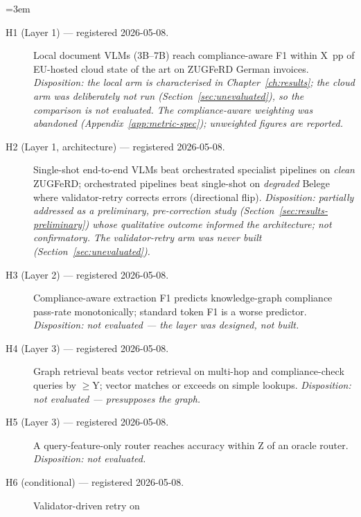 \begingroup\emergencystretch=3em
\begin{description}
  \item[H1 (Layer 1) --- registered 2026-05-08.] Local document \acp{VLM}
        (3B--7B) reach compliance-aware \ac{F1} within X~pp of \ac{EU}-hosted cloud
        state of the art on \ac{ZUGFeRD} German invoices.
        \emph{Disposition: the local arm is characterised in
        Chapter~\ref{ch:results}; the cloud arm was deliberately not run
        (Section~\ref{sec:unevaluated}), so the comparison is not evaluated. The
        compliance-aware weighting was abandoned
        (Appendix~\ref{app:metric-spec}); unweighted figures are reported.}
  \item[H2 (Layer 1, architecture) --- registered 2026-05-08.] Single-shot
        end-to-end \acp{VLM} beat orchestrated specialist pipelines on \emph{clean}
        \ac{ZUGFeRD}; orchestrated pipelines beat single-shot on \emph{degraded}
        Belege where validator-retry corrects errors (directional flip).
        \emph{Disposition: partially addressed as a preliminary, pre-correction
        study (Section~\ref{sec:results-preliminary}) whose qualitative outcome informed
        the architecture; not confirmatory. The validator-retry arm was never built
        (Section~\ref{sec:unevaluated}).}
  \item[H3 (Layer 2) --- registered 2026-05-08.] Compliance-aware extraction
        \ac{F1} predicts knowledge-graph compliance pass-rate monotonically;
        standard token \ac{F1} is a worse predictor.
        \emph{Disposition: not evaluated --- the layer was designed, not built.}
  \item[H4 (Layer 3) --- registered 2026-05-08.] Graph retrieval beats vector
        retrieval on multi-hop and compliance-check queries by ${\geq}$Y; vector
        matches or exceeds on simple lookups.
        \emph{Disposition: not evaluated --- presupposes the graph.}
  \item[H5 (Layer 3) --- registered 2026-05-08.] A query-feature-only router
        reaches accuracy within Z of an oracle router.
        \emph{Disposition: not evaluated.}
  \item[H6 (conditional) --- registered 2026-05-08.] Validator-driven retry on

\end{description}
